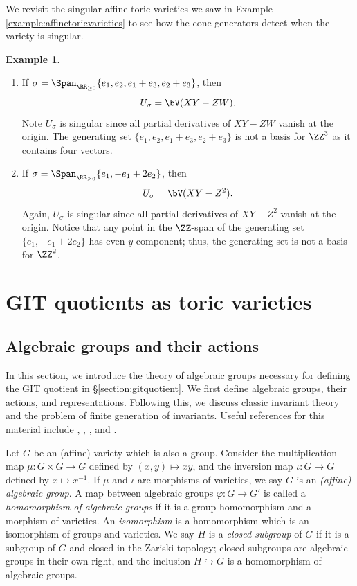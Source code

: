 \documentclass[12pt]{amsart}
\theoremstyle{plain}
\theoremstyle{definition}
\newtheorem{example}[theorem]{Example}
\begin{document}
We revisit the singular affine toric varieties we saw in Example \ref{example:affinetoricvarieties} to see how the cone generators detect when the variety is singular.

\begin{example}
\begin{enumerate}
\item If $\sigma = \Span_{\RR_{\ge 0}}\{e_1, e_2, e_1+e_3, e_2+e_3\}$, then
$$U_\sigma = \bV(XY - ZW).$$
Note $U_\sigma$ is singular since all partial derivatives of $XY-ZW$ vanish at the origin.
The generating set $\{e_1, e_2, e_1+e_3, e_2+e_3\}$ is not a basis for $\ZZ^3$ as it contains four vectors.
\item If $\sigma = \Span_{\RR_{\ge 0}}\{e_1, -e_1+2e_2\}$, then
$$U_\sigma = \bV(XY - Z^2).$$
Again, $U_\sigma$ is singular since all partial derivatives of $XY-Z^2$ vanish at the origin.
Notice that any point in the $\ZZ$-span of the generating set $\{e_1, -e_1+2e_2\}$ has even $y$-component; thus, the generating set is not a basis for $\ZZ^2$.
\end{enumerate}
\end{example}








\newpage
\section{GIT quotients as toric varieties}\label{chapter:gitquotientsastoricvarieties}

\subsection{Algebraic groups and their actions}
In this section, we introduce the theory of algebraic groups necessary for defining the GIT quotient in \S \ref{section:gitquotient}.
We first define algebraic groups, their actions, and representations.
Following this, we discuss classic invariant theory and the problem of finite generation of invariants.
Useful references for this material include \cite{Humphreys75}, \cite{Geck13}, \cite{Springer98}, and \cite{Mukai03}.

Let $G$ be an (affine) variety which is also a group.
Consider the multiplication map $\mu : G \times G \to G$ defined by $(x, y) \mapsto xy$, and the inversion map $\iota : G \to G$ defined by $x \mapsto x^{-1}$.
If $\mu$ and $\iota$ are morphisms of varieties, we say $G$ is an \emph{(affine) algebraic group}.
A map between algebraic groups $\varphi : G \to G'$ is called a \emph{homomorphism of algebraic groups} if it is a group homomorphism and a morphism of varieties.
An \emph{isomorphism} is a homomorphism which is an isomorphism of groups and varieties.
We say $H$ is a \emph{closed subgroup} of $G$ if it is a subgroup of $G$ and closed in the Zariski topology;
closed subgroups are algebraic groups in their own right, and the inclusion $H \hookrightarrow G$ is a homomorphism of algebraic groups.
\end{document}
